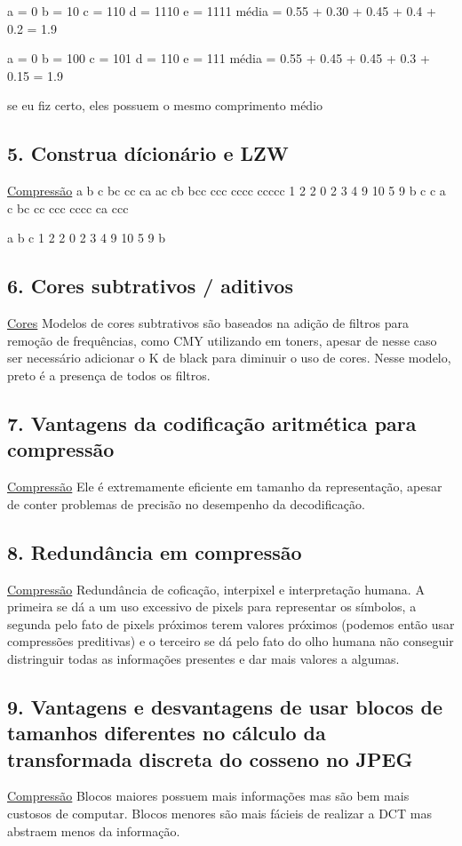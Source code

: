 \documentclass[twocolumn, 9pt]{article}
\begin{document}
a = 0
b = 10
c = 110
d = 1110
e = 1111
média = 0.55 + 0.30 + 0.45 + 0.4 + 0.2 = 1.9

a = 0
b = 100
c = 101
d = 110
e = 111
média = 0.55 + 0.45 + 0.45 + 0.3 + 0.15 = 1.9

se eu fiz certo, eles possuem o mesmo comprimento médio
\subsection*{5. Construa dícionário e LZW}
\label{sec:orgfab910a}
\hyperref[sec:orge460ab4]{Compressão}
a b c bc cc ca ac cb bcc ccc cccc ccccc
1 2 2 0 2 3   4    9     10     5 9
b c c a c bc cc  ccc  cccc ca ccc

a b c
1 2 2 0 2 3 4 9 10 5 9
b
\subsection*{6. Cores subtrativos / aditivos}
\label{sec:orgd86bac7}
\hyperref[sec:org14fa4aa]{Cores}
Modelos de cores subtrativos são baseados na adição de filtros para remoção de frequências, como CMY utilizando em toners, apesar de nesse caso ser necessário adicionar o K de black para diminuir o uso de cores. Nesse modelo, preto é a presença de todos os filtros.

\subsection*{7. Vantagens da codificação aritmética para compressão}
\label{sec:org2056289}
\hyperref[sec:orge460ab4]{Compressão}
Ele é extremamente eficiente em tamanho da representação, apesar de conter problemas de precisão no desempenho da decodificação.
\subsection*{8. Redundância em compressão}
\label{sec:orgf5cca98}
\hyperref[sec:orge460ab4]{Compressão}
Redundância de coficação, interpixel e interpretação humana. A primeira se dá a um uso excessivo de pixels para representar os símbolos, a segunda pelo fato de pixels próximos terem valores próximos (podemos então usar compressões preditivas) e o terceiro se dá pelo fato do olho humana não conseguir distringuir todas as informações presentes e dar mais valores a algumas.
\subsection*{9. Vantagens e desvantagens de usar blocos de tamanhos diferentes no cálculo da transformada discreta do cosseno no JPEG}
\label{sec:org56b8366}
\hyperref[sec:orge460ab4]{Compressão}
Blocos maiores possuem mais informações mas são bem mais custosos de computar.
Blocos menores são mais fácieis de realizar a DCT mas abstraem menos da informação.
\end{document}

